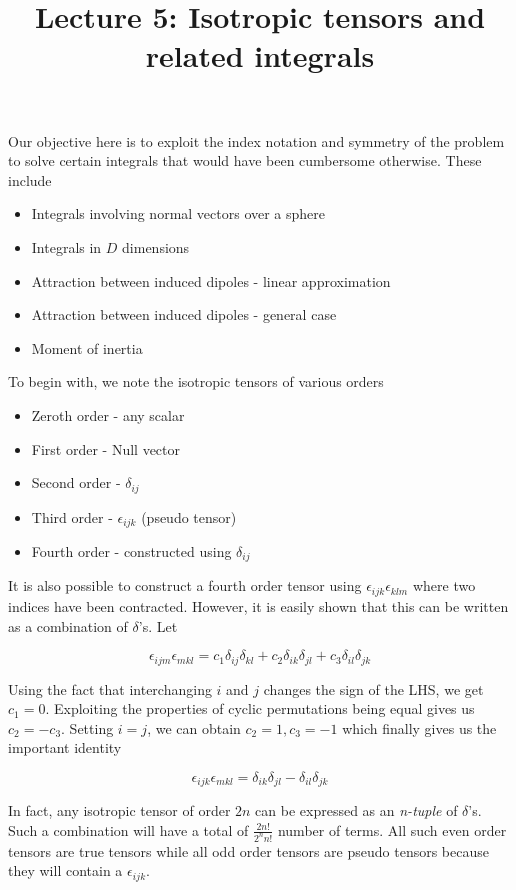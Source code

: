 \documentclass[11pt, letterpaper]{article}
\title{Lecture 5: Isotropic tensors and related integrals}
\newcommand{\e}{\epsilon}
\newcommand{\dl}{\delta}
\newcommand{\1}{\bm{1}}
\begin{document}
\maketitle

Our objective here is to exploit the index notation and symmetry of the problem to solve certain integrals that would have been cumbersome otherwise. These include

\begin{itemize}
  \item Integrals involving normal vectors over a sphere
  \item Integrals in $D$ dimensions
  \item Attraction between induced dipoles - linear approximation
  \item Attraction between induced dipoles - general case
  \item Moment of inertia
\end{itemize}

To begin with, we note the isotropic tensors of various orders 
\begin{itemize}
  \item Zeroth order - any scalar
  \item First order - Null vector
  \item Second order - $\dl_{ij}$
  \item Third order - $\e_{ijk}$ (pseudo tensor)
  \item Fourth order - constructed using $\dl_{ij}$ 
\end{itemize}

It is also possible to construct a fourth order tensor using $\e_{ijk}\e_{klm}$ where two indices have been contracted. However, it is easily shown that this can be written as a combination of $\dl$'s. Let

$$\e_{ijm}\e_{mkl} = c_1\dl_{ij}\dl_{kl} + c_2\dl_{ik}\dl_{jl} + c_3\dl_{il}\dl_{jk}$$

Using the fact that interchanging $i$ and $j$ changes the sign of the LHS, we get $c_1=0$. Exploiting the properties of cyclic permutations being equal gives us $c_2=-c_3$. Setting $i=j$, we can obtain $c_2=1, c_3=-1$ which finally gives us the important identity

$$\e_{ijk}\e_{mkl} = \dl_{ik}\dl_{jl} - \dl_{il}\dl_{jk}$$

In fact, any isotropic tensor of order $2n$ can be expressed as an \textit{n-tuple} of $\dl$'s. Such a combination will have a total of $\frac{2n!}{2^n n!}$ number of terms. All such even order tensors are true tensors while all odd order tensors are pseudo tensors because they will contain a $\e_{ijk}$.
\end{document}
